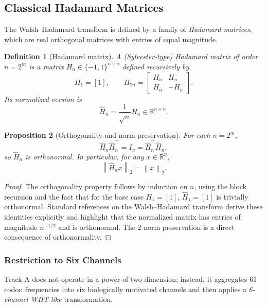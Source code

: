 \documentclass[11pt]{article}
\newtheorem{definition}{Definition}[section]
\newtheorem{proposition}[definition]{Proposition}
\newcommand{\R}{\mathbb{R}}
\newcommand{\norm}[1]{\left\lVert #1 \right\rVert}
\begin{document}
\subsection{Classical Hadamard Matrices}

The Walsh--Hadamard transform is defined by a family of \emph{Hadamard matrices}, which are real orthogonal matrices with entries of equal magnitude.\cite{HadamardOverview,HadamardOrthonormal}

\begin{definition}[Hadamard matrix]
A (Sylvester-type) Hadamard matrix of order \(n = 2^m\) is a matrix \(H_n \in \{-1,1\}^{n \times n}\) defined recursively by
\[
  H_1 = [1], \qquad
  H_{2n} = \begin{bmatrix}
    H_n & H_n \\[0.3em]
    H_n & -H_n
  \end{bmatrix}.
\]
Its normalized version is
\[
  \widehat{H}_n = \frac{1}{\sqrt{n}} H_n \in \R^{n \times n}.
\]
\end{definition}

\begin{proposition}[Orthogonality and norm preservation]
For each \(n = 2^m\),
\[
  \widehat{H}_n \widehat{H}_n^\top = I_n = \widehat{H}_n^\top \widehat{H}_n,
\]
so \(\widehat{H}_n\) is orthonormal. In particular, for any \(x \in \R^n\),
\[
  \norm{\widehat{H}_n x}_2 = \norm{x}_2.
\]
\end{proposition}

\begin{proof}
The orthogonality property follows by induction on \(n\), using the block recursion and the fact that for the base case \(H_1 = [1]\),
\(\widehat{H}_1 = [1]\) is trivially orthonormal. Standard references on the Walsh--Hadamard transform derive these identities explicitly and highlight that the normalized matrix has entries of magnitude \(n^{-1/2}\) and is orthonormal.\cite{HadamardOverview,HadamardOrthonormal} The 2-norm preservation is a direct consequence of orthonormality.
\end{proof}

\subsubsection{Restriction to Six Channels}

Track A does not operate in a power-of-two dimension; instead, it aggregates 61 codon frequencies into six biologically motivated channels and then applies a \emph{6-channel WHT-like} transformation.
\end{document}
